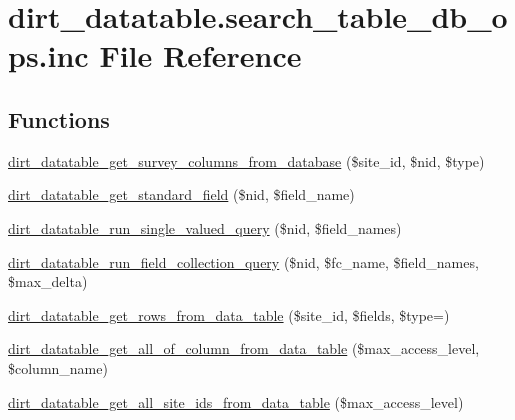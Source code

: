 \hypertarget{dirt__datatable_8search__table__db__ops_8inc}{}\section{dirt\+\_\+datatable.\+search\+\_\+table\+\_\+db\+\_\+ops.\+inc File Reference}
\label{dirt__datatable_8search__table__db__ops_8inc}
\subsection*{Functions}
\begin{DoxyCompactItemize}
\item 
\mbox{\hyperlink{dirt__datatable_8search__table__db__ops_8inc_ac55a9756065655726f91171eece0af6f}{dirt\+\_\+datatable\+\_\+get\+\_\+survey\+\_\+columns\+\_\+from\+\_\+database}} (\$site\+\_\+id, \$nid, \$type)
\item 
\mbox{\hyperlink{dirt__datatable_8search__table__db__ops_8inc_aff7efc95dec9c2d81a455c51c146116d}{dirt\+\_\+datatable\+\_\+get\+\_\+standard\+\_\+field}} (\$nid, \$field\+\_\+name)
\item 
\mbox{\hyperlink{dirt__datatable_8search__table__db__ops_8inc_ab02ca549d355a22a3ede1741766aa9ec}{dirt\+\_\+datatable\+\_\+run\+\_\+single\+\_\+valued\+\_\+query}} (\$nid, \$field\+\_\+names)
\item 
\mbox{\hyperlink{dirt__datatable_8search__table__db__ops_8inc_a340d91e49b1481545ea34327870479bf}{dirt\+\_\+datatable\+\_\+run\+\_\+field\+\_\+collection\+\_\+query}} (\$nid, \$fc\+\_\+name, \$field\+\_\+names, \$max\+\_\+delta)
\item 
\mbox{\hyperlink{dirt__datatable_8search__table__db__ops_8inc_a4bdea2f8554f919404d343d3b274e0eb}{dirt\+\_\+datatable\+\_\+get\+\_\+rows\+\_\+from\+\_\+data\+\_\+table}} (\$site\+\_\+id, \$fields, \$type=\textquotesingle{}\textquotesingle{})
\item 
\mbox{\hyperlink{dirt__datatable_8search__table__db__ops_8inc_aebce9294b19b233e15fc4228f0204171}{dirt\+\_\+datatable\+\_\+get\+\_\+all\+\_\+of\+\_\+column\+\_\+from\+\_\+data\+\_\+table}} (\$max\+\_\+access\+\_\+level, \$column\+\_\+name)
\item 
\mbox{\hyperlink{dirt__datatable_8search__table__db__ops_8inc_a96d6daf5279aa455fe26671255e34d00}{dirt\+\_\+datatable\+\_\+get\+\_\+all\+\_\+site\+\_\+ids\+\_\+from\+\_\+data\+\_\+table}} (\$max\+\_\+access\+\_\+level)
\item 

\end{DoxyCompactItemize}
